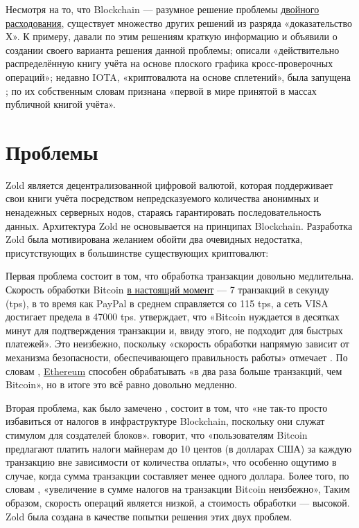 \documentclass[12pt,oneside]{article}
\begin{document}
Несмотря на то, что Blockchain --- разумное решение проблемы
\href{https://ru.wikipedia.org/wiki/%D0%94%D0%B2%D0%BE%D0%B9%D0%BD%D0%BE%D0%B5_%D1%80%D0%B0%D1%81%D1%85%D0%BE%D0%B4%D0%BE%D0%B2%D0%B0%D0%BD%D0%B8%D0%B5}{двойного расходования},
существует множество других решений из разряда «доказательство Х».
К примеру,  давали по этим решениям краткую информацию и объявили
о создании своего варианта решения данной проблемы;  описали
«действительно распределённую книгу учёта на основе плоского графика
кросс-проверочных операций»; недавно IOTA, «криптовалюта на основе сплетений», была
запущена ;  по их собственным словам
признана «первой в мире принятой в массах публичной
книгой учёта».

\pagebreak

\section*{Проблемы}

Zold является децентрализованной цифровой валютой, которая поддерживает свои
книги учёта посредством непредсказуемого количества анонимных и ненадежных
серверных нодов, стараясь гарантировать последовательность данных. Архитектура
Zold не основывается на принципах Blockchain. Разработка Zold была мотивирована желанием
обойти два очевидных недостатка, присутствующих в большинстве существующих
криптовалют:

Первая проблема состоит в том, что обработка транзакции довольно
медлительна. Скорость обработки Bitcoin
\href{https://goo.gl/sWiAWc}{в настоящий момент} --- 7 транзакций в
секунду (tps), в то время как PayPal в среднем справляется со 115 tps, а сеть
VISA достигает предела в 47000 tps.  утверждает, что «Bitcoin
нуждается в десятках минут для подтверждения транзакции и, ввиду этого, не
подходит для быстрых платежей». Это неизбежно, поскольку «скорость обработки
напрямую зависит от механизма безопасности, обеспечивающего правильность работы»
отмечает . По словам ,
\href{https://ethereum.org/}{Ethereum} способен обрабатывать
«в два раза больше транзакций, чем Bitcoin», но в итоге это всё равно довольно
медленно.

Вторая проблема, как было замечено , состоит в том, что «не так-то просто
избавиться от налогов в инфраструктуре Blockchain, поскольку они служат стимулом
для создателей блоков».  говорит, что «пользователям Bitcoin
предлагают платить налоги майнерам до 10 центов (в долларах США) за каждую
транзакцию вне зависимости от количества оплаты», что особенно ощутимо в случае,
когда сумма транзакции составляет менее одного доллара. Более того, по словам
, «увеличение в сумме налогов на транзакции Bitcoin неизбежно»,
Таким образом, скорость операций является низкой, а стоимость обработки ---
высокой. Zold была создана в качестве попытки решения этих двух проблем.
\end{document}
